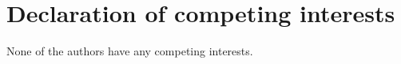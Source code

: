 \documentclass[a4paper,10pt]{article}
\begin{document}
\section*{Declaration of competing interests}
None of the authors have any competing interests.
\end{document}
